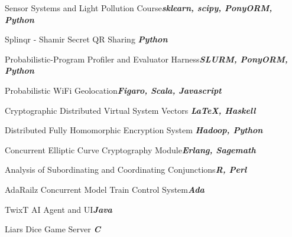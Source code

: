 \documentclass{article}
\newenvironment{*mylist}[2]{
  \subsubsection*{#1\hfill\small#2}
  \small
  \begin{list}{}{}
   \setlength{\topsep}{0pt}
   \setlength{\itemsep}{1pt}
   \setlength{\parskip}{0pt}
   \setlength{\parsep}{0pt}}{\end{list}\normalsize}
\newcommand{\LUx}[1]{{\bf\em #1}}
\begin{document}
\small
\vspace{-.08in}\begin{*mylist}{}{}
\item Sensor Systems and Light Pollution Course\hfill\LUx{sklearn, scipy, PonyORM, Python}
\item Splinqr - Shamir Secret QR Sharing \hfill\LUx{Python}
\item Probabilistic-Program Profiler and Evaluator Harness\hfill\LUx{SLURM, PonyORM, Python}
\item Probabilistic WiFi Geolocation\hfill\LUx{Figaro, Scala, Javascript}
\item Cryptographic Distributed Virtual System Vectors \hfill\LUx{\LaTeX, Haskell}
\item Distributed Fully Homomorphic Encryption System \hfill\LUx{Hadoop, Python}
\item Concurrent Elliptic Curve Cryptography Module\hfill\LUx{Erlang, Sagemath}
\item Analysis of Subordinating and Coordinating Conjunctions\hfill\LUx{R, Perl}
\item AdaRailz Concurrent Model Train Control System\hfill\LUx{Ada}
\item TwixT AI Agent and UI\hfill\LUx{Java}
\item Liars Dice Game Server \hfill\LUx{C}
\end{*mylist}
\end{document}
